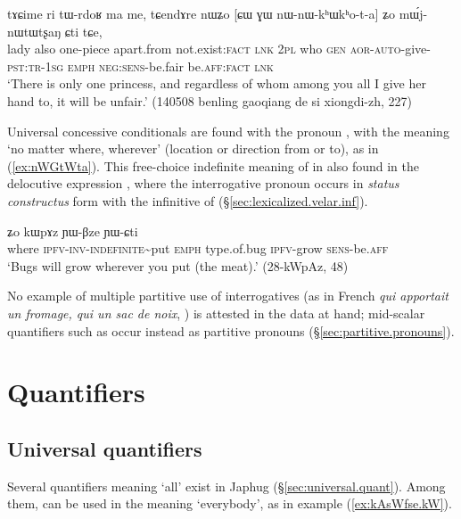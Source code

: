 \begin{exe}
\ex \label{ex:CW.GW.nWnWkhWkhota}
\gll tɤɕime ri tɯ-rdoʁ ma me, tɕendɤre nɯʑo [ɕɯ ɣɯ nɯ-nɯ-kʰɯ\redp{}kʰo-t-a] ʑo mɯ́j-nɯtɯtʂaŋ ɕti tɕe, \\
lady also one-piece apart.from not.exist:\textsc{fact} \textsc{lnk} \textsc{2pl} who \textsc{gen} \textsc{aor}-\textsc{auto}-give-\textsc{pst}:\textsc{tr}-\textsc{1sg} \textsc{emph} \textsc{neg}:\textsc{sens}-be.fair be.\textsc{aff}:\textsc{fact} \textsc{lnk} \\
\glt `There is only one princess, and regardless of whom among you all I give her hand to, it will be unfair.' (140508 benling gaoqiang de si xiongdi-zh, 227)
\end{exe}

Universal concessive conditionals are found with the pronoun , with the meaning `no matter where, wherever' (location or direction from or to), as in (\ref{ex:nWGtWta}). This free-choice indefinite meaning of   in also found in the delocutive expression , where the interrogative pronoun occurs in  \textit{status constructus} form  with the infinitive of   (§\ref{sec:lexicalized.velar.inf}).

\begin{exe}
\ex \label{ex:nWGtWta}
 ʑo kɯpɤz ɲɯ-βze ɲɯ-ɕti\\
 where \textsc{ipfv}-\textsc{inv}-\textsc{indefinite}\textasciitilde{}put \textsc{emph} type.of.bug \textsc{ipfv}-grow \textsc{sens}-be.\textsc{aff}\\
\glt `Bugs will grow wherever you put (the meat).' (28-kWpAz, 48)
\end{exe}


No example of multiple partitive use of interrogatives (as in French \textit{qui apportait un fromage, qui un sac de noix}, \citealt[177]{haspelmath97indef} ) is attested in the data at hand; mid-scalar quantifiers such as  occur instead as partitive pronouns (§\ref{sec:partitive.pronouns}). 


\section{Quantifiers} \label{sec:quantifiers.pronouns} \label{sec:aRandWndAt}


\subsection{Universal quantifiers} \label{sec:universal.pronouns}
Several quantifiers meaning `all' exist in Japhug (§\ref{sec:universal.quant}). Among them,  can be used in the meaning `everybody', as in example (\ref{ex:kAsWfse.kW}).

